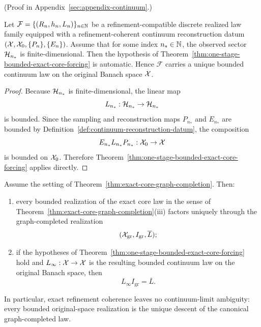(Proof in Appendix~\ref{sec:appendix-continuum}.)

\begin{corollary}
\label{cor:finite-exact-stage-closes-continuum-bridge}
Let \(\mathcal F=\{(R_n,h_n,L_n)\}_{n\in\mathbb{N}}\) be a refinement-compatible
discrete realized law family equipped with a refinement-coherent continuum
reconstruction datum \((\mathcal{X},\mathcal{X}_0,\{P_n\},\{E_n\})\). Assume that for some
index \(n_\ast\in\mathbb{N}\), the observed sector \(\mathcal{H}_{n_\ast}\) is
finite-dimensional. Then the hypothesis of
Theorem~\ref{thm:one-stage-bounded-exact-core-forcing} is automatic. Hence
\(\mathcal F\) carries a unique bounded continuum law on the original Banach
space \(\mathcal{X}\).
\end{corollary}

\begin{proof}
Because \(\mathcal{H}_{n_\ast}\) is finite-dimensional, the linear map
\[
L_{n_\ast}:\mathcal{H}_{n_\ast}\to\mathcal{H}_{n_\ast}
\]
is bounded. Since the sampling and reconstruction maps \(P_{n_\ast}\) and
\(E_{n_\ast}\) are bounded by
Definition~\ref{def:continuum-reconstruction-datum}, the composition
\[
E_{n_\ast}L_{n_\ast}P_{n_\ast}:\mathcal{X}_0\to\mathcal{X}
\]
is bounded on \(\mathcal{X}_0\). Therefore
Theorem~\ref{thm:one-stage-bounded-exact-core-forcing} applies directly.
\end{proof}

\begin{corollary}
\label{cor:exact-continuum-realization-no-ambiguity}
Assume the setting of
Theorem~\ref{thm:exact-core-graph-completion}. Then:
\begin{enumerate}[label=(\roman*), leftmargin=2em, itemsep=0.2em]
\item every bounded realization of the exact core law in the sense of
      Theorem~\ref{thm:exact-core-graph-completion}(iii) factors uniquely
      through the graph-completed realization
      \[
      (\mathcal{X}_{\mathrm{gr}},I_{\mathrm{gr}},\overline L);
      \]
\item if the hypotheses of
      Theorem~\ref{thm:one-stage-bounded-exact-core-forcing} hold and
      \(L_\infty:\mathcal{X}\to\mathcal{X}\) is the resulting bounded continuum law on the
      original Banach space, then
      \[
      L_\infty I_{\mathrm{gr}}=\overline L.
      \]
\end{enumerate}
In particular, exact refinement coherence leaves no continuum-limit ambiguity:
every bounded original-space realization is the unique descent of the canonical
graph-completed law.
\end{corollary}

